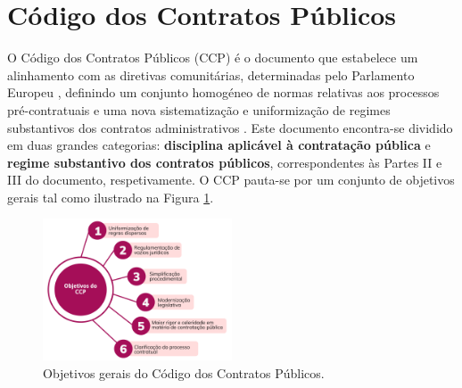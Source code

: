 



\section{Código dos Contratos Públicos}

O Código dos Contratos Públicos (CCP) é o documento que estabelece um alinhamento com as diretivas comunitárias,  determinadas pelo Parlamento Europeu \cite{ue_dire}, definindo um conjunto homogéneo de normas relativas aos processos pré-contratuais e uma nova sistematização e uniformização de regimes substantivos dos contratos administrativos \cite{guia_poise}. Este documento encontra-se dividido em duas grandes categorias: \textbf{disciplina aplicável à contratação pública} e \textbf{regime substantivo dos contratos públicos}, correspondentes às Partes II e III do documento, respetivamente. O CCP pauta-se por um conjunto de objetivos gerais tal como ilustrado na Figura \ref{fig:ccpgoals}.

\begin{figure}[H]
	\centering
	\includegraphics[width=0.5\textwidth]{imagens/ccp_objetivos.png}
	\caption{Objetivos gerais do Código dos Contratos Públicos.}
	\label{fig:ccpgoals}
\end{figure}


